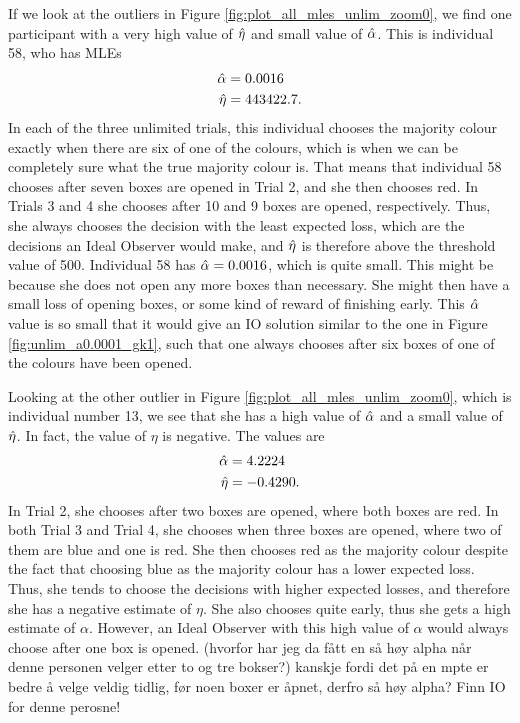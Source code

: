 If we look at the outliers in Figure \ref{fig:plot_all_mles_unlim_zoom0}, we find one participant with a very high value of $\hat{\eta}$ and small value of $\hat{\alpha}$. This is individual 58, who has MLEs
\begin{equation}
\label{mles_unlim_person58}
    \begin{aligned}
        \hat{\alpha} &= 0.0016\\
        \hat{\eta} &= 443422.7.
    \end{aligned}
\end{equation}
In each of the three unlimited trials, this individual chooses the majority colour exactly when there are six of one of the colours, which is when we can be completely sure what the true majority colour is. That means that individual 58 chooses after seven boxes are opened in Trial 2, and she then chooses red. In Trials 3 and 4 she chooses after 10 and 9 boxes are opened, respectively. Thus, she always chooses the decision with the least expected loss, which are the decisions an Ideal Observer would make, and $\hat{\eta}$ is therefore above the threshold value of 500. Individual 58 has $\hat{\alpha}=0.0016$, which is quite small. This might be because she does not open any more boxes than necessary. She might then have a small loss of opening boxes, or some kind of reward of finishing early. This $\hat{\alpha}$ value is so small that it would give an IO solution similar to the one in Figure \ref{fig:unlim_a0.0001_gk1}, such that one always chooses after six boxes of one of the colours have been opened. 

Looking at the other outlier in Figure \ref{fig:plot_all_mles_unlim_zoom0}, which is individual number 13, we see that she has a high value of $\hat{\alpha}$ and a small value of $\hat{\eta}$. In fact, the value of $\eta$ is negative. The values are
\begin{equation}
\label{mles_unlim_person13}
    \begin{aligned}
        \hat{\alpha} &= 4.2224\\
        \hat{\eta} &= -0.4290.
    \end{aligned}
\end{equation}
In Trial 2, she chooses after two boxes are opened, where both boxes are red. In both Trial 3 and Trial 4, she chooses when three boxes are opened, where two of them are blue and one is red. She then chooses red as the majority colour despite the fact that choosing blue as the majority colour has a lower expected loss. Thus, she tends to choose the decisions with higher expected losses, and therefore she has a negative estimate of $\eta$. She also chooses quite early, thus she gets a high estimate of $\alpha$. However, an Ideal Observer with this high value of $\alpha$ would always choose after one box is opened. (hvorfor har jeg da fått en så høy alpha når denne personen velger etter to og tre bokser?)
kanskje fordi det på en mpte er bedre å velge veldig tidlig, før noen boxer er åpnet, derfro så høy alpha? Finn IO for denne perosne!

